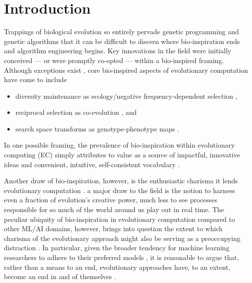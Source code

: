 \section{Introduction} \label{sec:introduction}

Trappings of biological evolution so entirely pervade genetic programming and genetic algorithms that it can be difficult to discern where bio-inspiration ends and algorithm engineering begins.
Key innovations in the field were initially conceived --- or were promptly co-opted --- within a bio-inspired framing.
Although exceptions exist \citep{TODO}, core bio-inspired aspects of evolutionary computation have come to include
\begin{itemize}
  \item diversity maintenance as ecology/negative frequency-dependent selection \citep{TODO},
  \item reciprocal selection as co-evolution \citep{TODO}, and
  \item search space transforms as genotype-phenotype maps \citep{TODO}.
\end{itemize}
In one possible framing, the prevalence of bio-inspiration within evolutionary computing (EC) simply attributes to value as a source of impactful, innovative ideas and convenient, intuitive, self-consistent vocabulary \citep{sorensen2015metaheuristics,banzhaf2006artificial}.

Another draw of bio-inspiration, however, is the enthusiastic charisma it lends evolutionary computation \citep{lehman2020surprising}.
a major draw to the field is the notion to harness even a fraction of evolution's creative power, much less to see processes responsible for so much of the world around us play out in real time.
The peculiar ubiquity of bio-inspiration in evolutionary computation compared to other ML/AI domains, however, brings into question the extent to which charisma of the evolutionary approach might also be serving as a preoccupying distraction \citep{moore2023evolution,sorensen2015metaheuristics}.
In particular, given the broader tendency for machine learning researchers to adhere to their preferred models \citep{domingos2012few}, it is reasonable to argue that, rather than a means to an end, evolutionary approaches have, to an extent, become an end in and of themselves \citep{woodward2016gp,yampolskiy2018we}.


